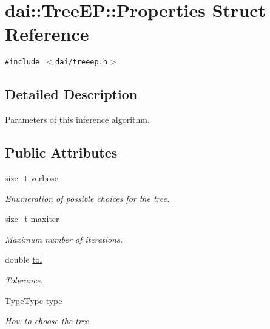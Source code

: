 \hypertarget{structdai_1_1TreeEP_1_1Properties}{
\section{dai::TreeEP::Properties Struct Reference}
\label{structdai_1_1TreeEP_1_1Properties}
}
{\tt \#include $<$dai/treeep.h$>$}



\subsection{Detailed Description}
Parameters of this inference algorithm. \subsection*{Public Attributes}
\begin{CompactItemize}
\item 
size\_\-t \hyperlink{structdai_1_1TreeEP_1_1Properties_f41d83b6886eed09e080420be1fe0486}{verbose}
\begin{CompactList}\small\item\em Enumeration of possible choices for the tree. \item\end{CompactList}\item 
\hypertarget{structdai_1_1TreeEP_1_1Properties_58b7b2658dfa173a64a1683a6ac5425d}{
size\_\-t \hyperlink{structdai_1_1TreeEP_1_1Properties_58b7b2658dfa173a64a1683a6ac5425d}{maxiter}}
\label{structdai_1_1TreeEP_1_1Properties_58b7b2658dfa173a64a1683a6ac5425d}

\begin{CompactList}\small\item\em Maximum number of iterations. \item\end{CompactList}\item 
\hypertarget{structdai_1_1TreeEP_1_1Properties_084e74547be3ae87576ce6ee849fea5f}{
double \hyperlink{structdai_1_1TreeEP_1_1Properties_084e74547be3ae87576ce6ee849fea5f}{tol}}
\label{structdai_1_1TreeEP_1_1Properties_084e74547be3ae87576ce6ee849fea5f}

\begin{CompactList}\small\item\em Tolerance. \item\end{CompactList}\item 
\hypertarget{structdai_1_1TreeEP_1_1Properties_f80877d6d20176db4bc8367b6185e2d3}{
TypeType \hyperlink{structdai_1_1TreeEP_1_1Properties_f80877d6d20176db4bc8367b6185e2d3}{type}}
\label{structdai_1_1TreeEP_1_1Properties_f80877d6d20176db4bc8367b6185e2d3}

\begin{CompactList}\small\item\em How to choose the tree. \item\end{CompactList}\end{CompactItemize}


